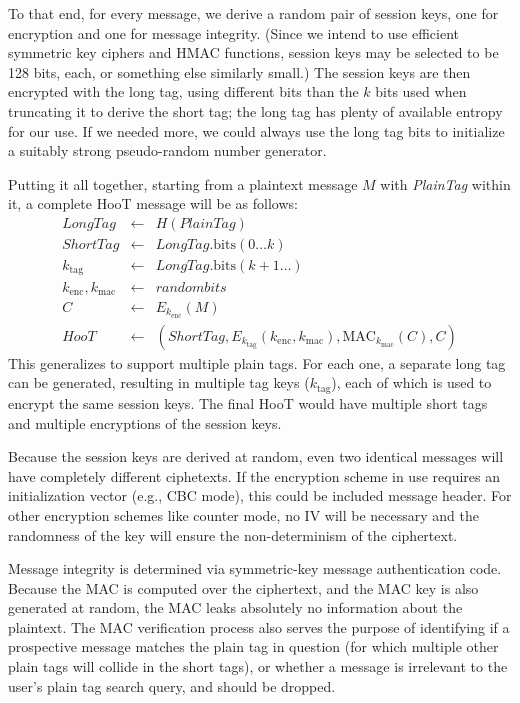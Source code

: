To that end, for every message, we derive a random pair of session keys, one for encryption and one for message integrity. (Since we intend to use efficient symmetric key ciphers and HMAC functions, session keys may be selected to be 128 bits, each, or something else similarly small.) The session keys are then encrypted with the long tag, using different bits than the $k$ bits used when truncating it to derive the short tag; the long tag has plenty of available entropy for our use. If we needed more, we could always use the long tag bits to initialize a suitably strong pseudo-random number generator.

Putting it all together, starting from a plaintext message $M$ with {\em PlainTag} within it, a complete HooT message will be as follows:
%
\begin{eqnarray*}
\mathit{LongTag} & \leftarrow & H(\mathit{PlainTag}) \\
\mathit{ShortTag} & \leftarrow & \mathit{LongTag}.\mathrm{bits}(0 \ldots k) \\
k_{\mathrm{tag}} & \leftarrow & \mathit{LongTag}.\mathrm{bits}(k+1 \ldots) \\
k_{\mathrm{enc}}, k_{\mathrm{mac}} & \leftarrow & \mathit{random bits} \\
C & \leftarrow & E_{k_{\mathrm{enc}}}(M) \\
\mathit{HooT}  & \leftarrow &  \left(\mathit{ShortTag}, E_{k_{\mathrm{tag}}} \left(k_{\mathrm{enc}}, k_{\mathrm{mac}}\right), \mathrm{MAC}_{k_{\mathrm{mac}}}(C), C\right)
\end{eqnarray*}
%
This generalizes to support multiple plain tags. For each one, a separate long tag can be generated, resulting in multiple tag keys ($k_\mathrm{tag}$), each of which is used to encrypt the same session keys. The final HooT would have multiple short tags and multiple encryptions of the session keys.

Because the session keys are derived at random, even two identical messages will have completely different ciphetexts. If the encryption scheme in use requires an initialization vector (e.g., CBC mode), this could be included message header. For other encryption schemes like counter mode, no IV will be necessary and the randomness of the key will ensure the non-determinism of the ciphertext.

Message integrity is determined via symmetric-key message authentication code. Because the MAC is computed over the ciphertext, and the MAC key is also generated at random, the MAC leaks absolutely no information about the plaintext. The MAC verification process also serves the purpose of identifying if a prospective message matches the plain tag in question (for which multiple other plain tags will collide in the short tags), or whether a message is irrelevant to the user's plain tag search query, and should be dropped.

